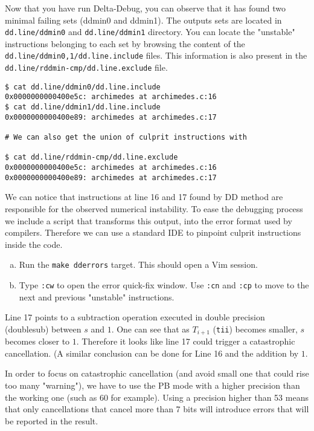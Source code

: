 Now that you have run Delta-Debug, you can observe that it has found two minimal failing sets (ddmin0 and ddmin1). The outputs sets are located in \texttt{dd.line/ddmin0} and \texttt{dd.line/ddmin1} directory. You can locate the "unstable" instructions belonging to each set by browsing the content of the \texttt{dd.line/ddmin{0,1}/dd.line.include} files. This information is also present in the \texttt{dd.line/rddmin-cmp/dd.line.exclude} file.

\begin{verbatim}
$ cat dd.line/ddmin0/dd.line.include
0x0000000000400e5c: archimedes at archimedes.c:16
$ cat dd.line/ddmin1/dd.line.include
0x0000000000400e89: archimedes at archimedes.c:17

# We can also get the union of culprit instructions with

$ cat dd.line/rddmin-cmp/dd.line.exclude
0x0000000000400e5c: archimedes at archimedes.c:16
0x0000000000400e89: archimedes at archimedes.c:17
\end{verbatim}

We can notice that instructions at line 16 and 17 found by DD method are responsible for the observed numerical instability. To ease the debugging process we include a script that transforms this output, into the error format used by compilers. Therefore we can use a standard IDE to pinpoint culprit instructions inside the code.

\begin{question}
  \begin{enumerate}[(a)]
    \item Run the \texttt{make dderrors} target. This should open a Vim session.
    \item Type \texttt{:cw} to open the error quick-fix window. Use \texttt{:cn} and \texttt{:cp} to move to the next and previous "unstable" instructions.
  \end{enumerate}
\end{question}

Line 17 points to a subtraction operation executed in double precision (doublesub) between $s$ and $1$. One can see that as $T_{i+1}$ (\texttt{tii}) becomes smaller, $s$ becomes closer to $1$. Therefore it looks like line 17 could trigger a catastrophic cancellation. (A similar conclusion can be done for Line 16 and the addition by $1$.

In order to focus on catastrophic cancellation (and avoid small one that could rise too many "warning"), we have to use the PB mode with a higher precision than the working one (such as 60 for example). 
Using a precision higher than 53 means that only cancellations that cancel more than 7 bits will introduce errors that will be reported in the result.

